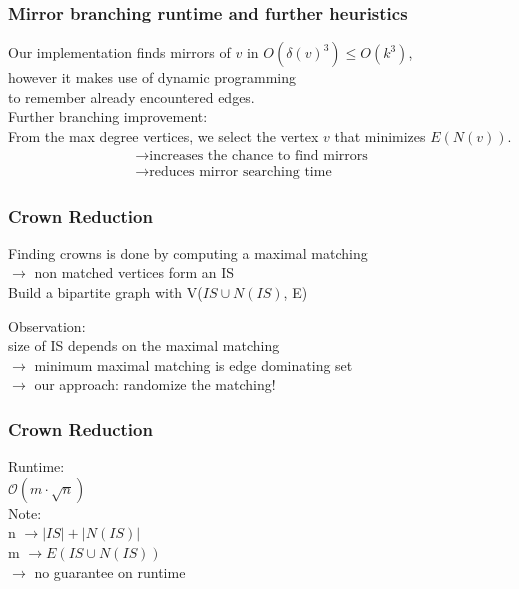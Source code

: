 \documentclass{beamer}[12pt]
\begin{document}
	\begin{frame}
		\frametitle{Mirror branching runtime and further heuristics}

			Our implementation finds mirrors of $ v $ in $ O(\delta(v)^3) \leq O(k^3)$, \\
			however it makes use of dynamic programming \\
			to remember already encountered edges.\\
			\pause
			\vspace*{10mm}
			Further branching improvement:\\
			From the max degree vertices, we select the vertex $ v $ that minimizes $ E(N(v)) $.\\
			\pause
			\begin{align*}
				&\rightarrow \text{increases the chance to find mirrors} \qquad\\
				&\rightarrow \text{reduces mirror searching time} \qquad
			\end{align*}

	\end{frame}
	
	\begin{frame}
		\frametitle{Crown Reduction}
		
		Finding crowns is done by computing a maximal matching\\
		$\rightarrow$ non matched vertices form an IS\\
		Build a bipartite graph with V($IS \cup N(IS)$, E) \\
		\pause
		\vspace{5mm}
		
		{\large Observation:}\\
		size of IS depends on the maximal matching\\
		$\rightarrow$ minimum maximal matching is edge dominating set \\ 
		\pause
		$\rightarrow$ our approach: randomize the matching! \\
		
	\end{frame}
		
	\begin{frame}
		\frametitle{Crown Reduction}
		Runtime: \\
		\quad $\mathcal{O} (m \cdot \sqrt{n})$\\
		\vspace{3mm}
		{\large Note: }\\
		\quad n $\rightarrow |IS| + |N(IS)|$ \\
		\quad m $\rightarrow E(IS \cup N(IS))$ \\
		
		\large $\rightarrow$ no guarantee on runtime
	\end{frame}
\end{document}
